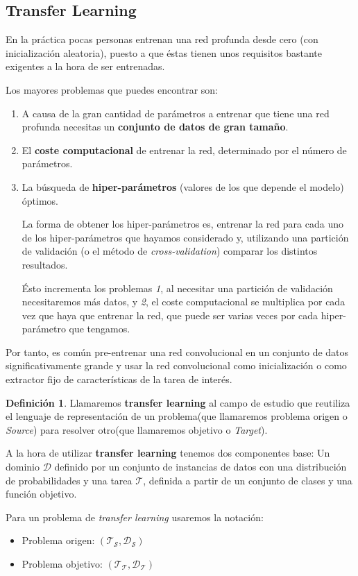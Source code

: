 \documentclass[12,twoside]{TFG-GM}
\theoremstyle{definition}
\newtheorem{definition}[theorem]{Definición}
\theoremstyle{remark}
\begin{document}
\newpage
\subsection{Transfer Learning}

En la práctica pocas personas entrenan una red profunda desde cero (con inicialización aleatoria), puesto a que éstas tienen unos requisitos bastante exigentes a la hora de ser entrenadas. 

Los mayores problemas que puedes encontrar son: 
\begin{enumerate}
\item A causa de la gran cantidad de parámetros a entrenar que tiene una red profunda necesitas un \textbf{conjunto de datos de gran tamaño}.
\item El \textbf{coste computacional} de entrenar la red, determinado por el número de parámetros. 
\item La búsqueda de \textbf{hiper-parámetros} (valores de los que depende el modelo) óptimos. 

La forma de obtener los hiper-parámetros es, entrenar la red para cada uno de los hiper-parámetros que hayamos considerado y, utilizando una partición de validación (o el método de \textit{cross-validation}) comparar los distintos resultados.  

Ésto incrementa los problemas \textit{1}, al necesitar una partición de validación necesitaremos más datos, y \textit{2}, el coste computacional se multiplica por cada vez que haya que entrenar la red, que puede ser varias veces por cada hiper-parámetro que tengamos.
\end{enumerate}\par
Por tanto, es común pre-entrenar una red convolucional en un conjunto de datos significativamente grande y usar la red convolucional como inicialización o como extractor fijo de características de la tarea de interés. 
\begin{definition}
Llamaremos \textbf{transfer learning} al campo de estudio que reutiliza el lenguaje de representación de un problema(que llamaremos problema origen o \textit{Source}) para resolver otro(que llamaremos objetivo o \textit{Target}). 

A la hora de utilizar \textbf{transfer learning} tenemos dos componentes base:  Un dominio $\mathcal{D}$ definido por un conjunto de instancias de datos con una distribución de probabilidades y una tarea $\mathcal{T}$, definida a partir de un conjunto de clases y una función objetivo.

Para un problema de \textit{transfer learning} usaremos la notación: 
\begin{itemize}
\item Problema origen: $(\mathcal{T_S},\mathcal{D_S})$
\item Problema objetivo: $(\mathcal{T_T},\mathcal{D_T})$
\end{itemize}

\end{definition}
\end{document}

